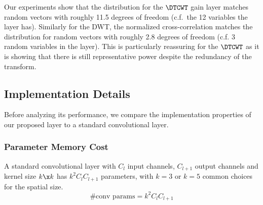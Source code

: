 Our experiments show that the distribution for the $\DTCWT$ gain layer matches
random vectors with roughly 11.5 degrees of freedom (c.f.\ the 12 variables 
the layer has). 
Similarly for the DWT, the normalized cross-correlation matches the distribution for random vectors
with roughly 2.8 degrees of freedom (c.f. 3 random variables in the layer).
This is particularly reassuring for the $\DTCWT$ as it is showing that there is
still representative power despite the redundancy of the transform.

\begin{figure}
  \centering
  \newline
  \label{fig:ch6:examples}
\end{figure}


\subsection{Implementation Details}
Before analyzing its performance, we compare the implementation properties of
our proposed layer to a standard convolutional layer.

\subsubsection{Parameter Memory Cost}\label{sec:ch6:memory}
A standard convolutional layer with $C_l$ input channels, $C_{l+1}$ output channels
and kernel size $k\x k$ has $k^2C_{l}C_{l+1}$ parameters, with $k=3$ or $k=5$
common choices for the spatial size.
\begin{equation}
  \text{\#conv params} = k^2C_lC_{l+1}
\end{equation}

